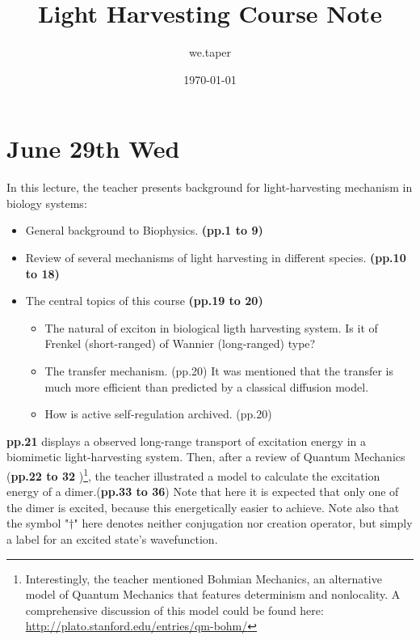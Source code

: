 \documentclass{article}
\title{Light Harvesting Course Note}
\date{\today}
\author{we.taper}
\numberwithin{equation}{subsection} %
\theoremstyle{definition}
\begin{document}
\maketitle

\tableofcontents

\section{June 29th Wed}
\label{sec:June_29th}

In this lecture, the teacher presents background for light-harvesting
mechanism in biology systems:
\begin{itemize}
    \item 
        General background to Biophysics.
        \textbf{(pp.1 to 9)} 
    \item 
        Review of several mechanisms of light harvesting in different 
        species.
        \textbf{(pp.10 to 18)}
    \item 
        The central topics of this course
        \textbf{(pp.19 to 20)}
        \begin{itemize}
            \item The natural of exciton in biological ligth harvesting 
                system.
                Is it of Frenkel (short-ranged) of Wannier (long-ranged) type?
            \item The transfer mechanism. (pp.20) It was mentioned that
                the transfer is much more efficient than predicted
                by a classical diffusion model.
            \item How is active self-regulation archived. (pp.20)
        \end{itemize}
\end{itemize}
\textbf{pp.21} displays a observed long-range transport of excitation
    energy in a biomimetic light-harvesting system.
Then, after a review of Quantum Mechanics (\textbf{pp.22 to 32} )\footnote{
    Interestingly, the teacher mentioned Bohmian Mechanics, an alternative
    model of Quantum Mechanics that features determinism and nonlocality.
    A comprehensive discussion of this model could be found here:
    \url{http://plato.stanford.edu/entries/qm-bohm/}
}, the teacher illustrated a model to calculate
the excitation energy of a dimer.(\textbf{pp.33 to 36})
Note that here it is expected that only one of the
dimer is excited, because this energetically easier to achieve.
Note also that the
symbol "$\dagger$" here denotes neither conjugation nor creation operator,
but simply a label for an excited state's wavefunction. 
\end{document}
